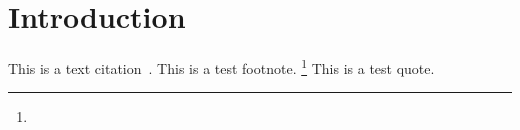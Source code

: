 \chapter{Introduction}
This is a text citation~\cite{Knight2021}.
\lipsum[1]
This is a test footnote.%
\footnote{\lipsum[3]}
\lipsum[2-3]
This is a test quote.
\begin{quote}
  \lipsum[3]
\end{quote}
\lipsum[4-5]